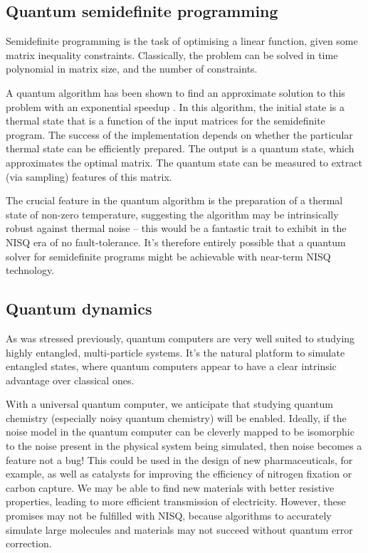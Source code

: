 \subsection{Quantum semidefinite programming}

Semidefinite programming is the task of optimising a linear function, given some matrix inequality constraints. Classically, the problem can be solved in time polynomial in matrix size, and the number of constraints.

A quantum algorithm has been shown to find an approximate solution to this problem with an exponential speedup \cite{bib:brandao2017quantum, bib:brandao2017exponential}. In this algorithm, the initial state is a thermal state that is a function of the input matrices for the semidefinite program. The success of the implementation depends on whether the particular thermal state can be efficiently prepared. The output is a quantum state, which approximates the optimal matrix. The quantum state can be measured to extract (via sampling) features of this matrix. 

The crucial feature in the quantum algorithm is the preparation of a thermal state of non-zero temperature, suggesting the algorithm may be intrinsically robust against thermal noise -- this would be a fantastic trait to exhibit in the NISQ era of no fault-tolerance. It's therefore entirely possible that a quantum solver for semidefinite programs might be achievable with near-term NISQ technology.

\subsection{Quantum dynamics}

As was stressed previously, quantum computers are very well suited to studying highly entangled, multi-particle systems. It's the natural platform to simulate entangled states, where quantum computers appear to have a clear intrinsic advantage over classical ones.
 
With a universal quantum computer, we anticipate that studying quantum chemistry (especially noisy quantum chemistry) will be enabled. Ideally, if the noise model in the quantum computer can be cleverly mapped to be isomorphic to the noise present in the physical system being simulated, then noise becomes a feature not a bug! This could be used in the design of new pharmaceuticals, for example, as well as catalysts for improving the efficiency of nitrogen fixation or carbon capture. We may be able to find new materials with better resistive properties, leading to more efficient transmission of electricity. However, these promises may not be fulfilled with NISQ, because algorithms to accurately simulate large molecules and materials may not succeed without quantum error correction.

